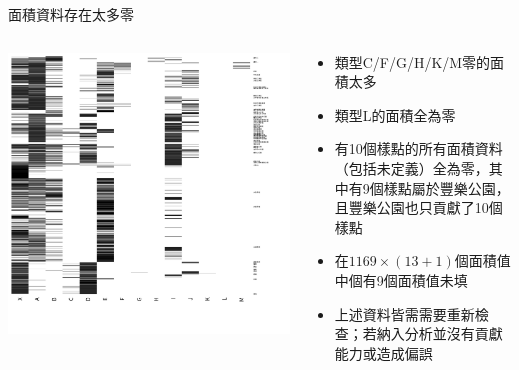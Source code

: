 \documentclass[10pt, aspectratio=1610, xcolor=table]{beamer}
\begin{document}
\begin{frame}{面積資料存在太多零}
\begin{columns}[onlytextwidth, c]
	\begin{column}{0.55\textwidth}
	\includegraphics[trim=25 25 25 25, width=1\textwidth]{invalid-type.png}
	\end{column}
	\begin{column}{0.45\textwidth}
		\begin{itemize}
			\item 類型C/F/G/H/K/M零的面積太多
			\item 類型L的面積全為零
			\item 有10個樣點的所有面積資料（包括未定義）全為零，其中有9個樣點屬於豐樂公園，且豐樂公園也只貢獻了10個樣點
			\item 在$1169 \times (13+1)$個面積值中個有9個面積值未填
			\item 上述資料皆需需要重新檢查；若納入分析並沒有貢獻能力或造成偏誤
		\end{itemize}
	\end{column}
\end{columns}
\end{frame}
\end{document}
